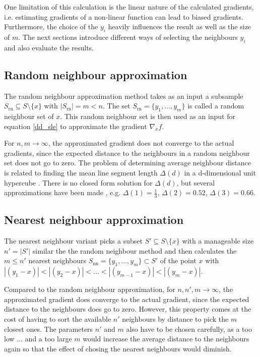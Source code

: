 \documentclass[
  a4paper,  %
  twoside,  %
  bibliography=totoc,
  headsepline,
  cleardoublepage=empty,
  parskip=half,
  draft=false
]{scrbook}
\begin{document}
One limitation of this calculation is the linear nature of the calculated gradients, i.e. estimating gradients of a non-linear function can lead to biased gradients.
Furthermore, the choice of the $y_i$ heavily influences the result as well as the size of $m$.
The next sections introduce different ways of selecting the neighbours $y_i$ and also evaluate the results.

\subsection{Random neighbour approximation}

The random neighbour approximation method takes as an input a subsample $S_{\text{rn}} \subseteq S \setminus \{x\}$ with $|S_{\text{rn}}|=m < n$.
The set $S_{\text{rn}}=\{y_1, \dots, y_{m}\}$ is called a random neighbour set of $x$.
This random neighbour set is then used as an input for equation \ref{dd_sle} to approximate the gradient $\nabla_x f$.

For $n,m \to \infty$, the approximated gradient does not converge to the actual gradients, since the expected distance to the neighbours in a random neighbour set does not go to zero.
The problem of determining average neighbour distance is related to finding the mean line segment length $\Delta (d)$ in a d-dimensional unit hypercube \cite{}.
There is no closed form solution for $\Delta (d)$, but several approximations have been made \cite{}, e.g. $\Delta (1)=\frac{1}{3}$, $\Delta (2)=0.52$, $\Delta (3)=0.66$.

\subsection{Nearest neighbour approximation}

The nearest neighbour variant picks a subset $S' \subseteq S \setminus \{x\}$ with a manageable size $n'=|S'|$ similar the the random neighbour method and then calculates the $m \leq n'$ nearest neighbours $S_{\text{nn}}=\{y_1,\dots,y_m\} \subset S'$ of the point $x$ with $|(y_1-x)| < |(y_2-x)|< \dots<|(y_{m-1}-x)| < |(y_{m}-x)|$.

Compared to the random neighbour approximation, for $n,n',m \to \infty$, the approximated gradient does converge to the actual gradient, since the expected distance to the neighbours does go to zero.
However, this property comes at the cost of having to sort the available $n'$ neighbours by distance to pick the $m$ closest ones.
The parameters $n'$ and $m$ also have to be chosen carefully, as a too low ... and a too large $m$ would increase the average distance to the neighbours again so that the effect of chosing the nearest neighbours would diminish.
\end{document}
